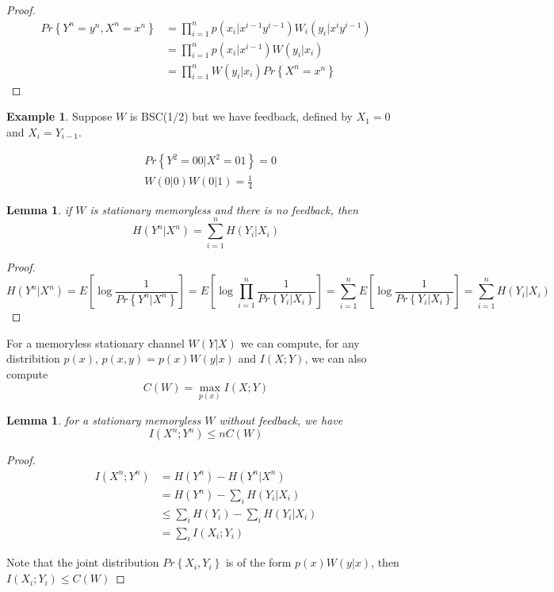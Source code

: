 \documentclass[twoside]{article}
\newtheorem{lemma}[theorem]{Lemma}
\theoremstyle{definition} %
\newtheorem{example}{Example}
\renewcommand{\Pr}[1]{Pr\left\{#1\right\}}
\newcommand{\Ex}[1]{E\left[#1\right]}
\begin{document}
\begin{proof}
  \begin{align*}
    \Pr{Y^n=y^n, X^n=x^n} &= \prod_{i=1}^n p(x_i|x^{i-1}y^{i-1})W_i(y_i|x^iy^{i-1})\\
    &= \prod_{i=1}^n p(x_i|x^{i-1})W(y_i|x_i)\\
    &= \prod_{i=1}^n W(y_i|x_i) \Pr{X^n=x^n}
  \end{align*}
\end{proof}

\begin{example}
  Suppose $W$ is BSC(1/2) but we have feedback, defined by $X_1=0$ and $X_i=Y_{i-1}$.

  \begin{align*}
    &\Pr{Y^2=00|X^2=01} = 0\\
    &W(0|0)W(0|1) = \frac 1 4
  \end{align*}

\end{example}

\begin{lemma}
  if $W$ is stationary memoryless and there is no feedback, then
  \[
    H(Y^n|X^n) = \sum_{i=1}^n H(Y_i|X_i)
  \]

\end{lemma}

\begin{proof}
  \[
    H(Y^n|X^n) = \Ex{\log \frac 1 {\Pr{Y^n|X^n}}}
    = \Ex{\log \prod_{i=1}^n \frac 1 {\Pr{Y_i|X_i}}}
    = \sum_{i=1}^n \Ex{\log \frac 1 {\Pr{Y_i|X_i}}}
    = \sum_{i=1}^n H(Y_i|X_i)
  \]
\end{proof}

For a memoryless stationary channel $W(Y|X)$ we can compute, for any
distribition $p(x)$, $p(x,y) = p(x)W(y|x)$ and $I(X;Y)$, we can also compute
\[
  C(W) = \max_{p(x)} I(X;Y)
\]

\begin{lemma}
  for a stationary memoryless $W$ without feedback, we have
  \[
    I(X^n;Y^n) \leq n C(W)
  \]
\end{lemma}


\begin{proof}
  \begin{align*}
    I(X^n;Y^n) &= H(Y^n) - H(Y^n|X^n)\\
    &= H(Y^n)- \sum_i H(Y_i|X_i)\\
    &\leq \sum_i H(Y_i) - \sum_i H(Y_i|X_i)\\
    &= \sum_i I(X_i;Y_i)
  \end{align*}

  Note that the joint distribution $\Pr{X_i,Y_i}$ is of the form $p(x)W(y|x)$, then $I(X_i;Y_i) \leq C(W)$
\end{proof}
\end{document}
